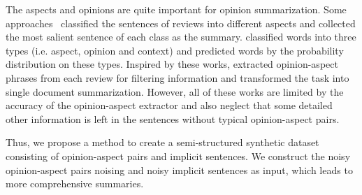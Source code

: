 The aspects and opinions are quite important for opinion summarization.
Some approaches~\cite{AngelidisL18,MukherjeePVGBG20} classified the sentences of reviews into different aspects and collected the most salient sentence of each class as the summary.
\citet{TianY019} %
classified words into three types (i.e. aspect, opinion and context) and predicted words by the probability distribution on these types.
Inspired by these works,
\citet{OpiDig20} extracted opinion-aspect phrases from each review for filtering information and transformed the task into single document summarization. 
However, all of these works are limited by the accuracy of 
the opinion-aspect extractor and also
neglect that some detailed other information is left in the sentences without typical opinion-aspect pairs. 

Thus, we propose a method to create a semi-structured synthetic dataset consisting of
opinion-aspect pairs and implicit sentences. 
We construct the noisy opinion-aspect pairs noising and noisy implicit sentences as input, which leads to more comprehensive summaries.  
